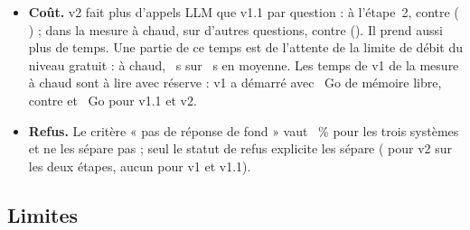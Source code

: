 \begin{itemize}
  \item \textbf{Coût.} v2 fait plus d'appels LLM que v1.1 par question : à l'étape~2, \EvStwoVtwoCalls{} contre \EvStwoVoneoneCalls{}
        (\EvDiffStwoVtwoVoneoneCalls{} \EvDiffStwoVtwoVoneoneCallsCI) ; dans la mesure à chaud, sur d'autres questions, \EvLatVtwoCalls{} contre
        \EvLatVoneoneCalls{} (\EvLatCallsDiff). Il prend aussi plus de temps. Une partie de ce temps est de l'attente de la limite de débit du niveau
        gratuit : à chaud, \EvLatVtwoMeanWait~s sur \EvLatVtwoWallMean~s en moyenne. Les temps de v1 de la mesure à chaud sont à lire avec réserve :
        v1 a démarré avec \EvLatVoneRamAvail~Go de mémoire libre, contre \EvLatVoneoneRamAvail{} et \EvLatVtwoRamAvail~Go pour v1.1 et v2.
  \item \textbf{Refus.} Le critère « pas de réponse de fond » vaut \EvSoneVoneRefNoSubst~\% pour les trois systèmes et ne les sépare pas ;
        seul le statut de refus explicite les sépare (\EvPreExplicitCount{} pour v2 sur les deux étapes, aucun pour v1 et v1.1).
\end{itemize}

\subsection{Limites}\label{sec:limites-finale}

